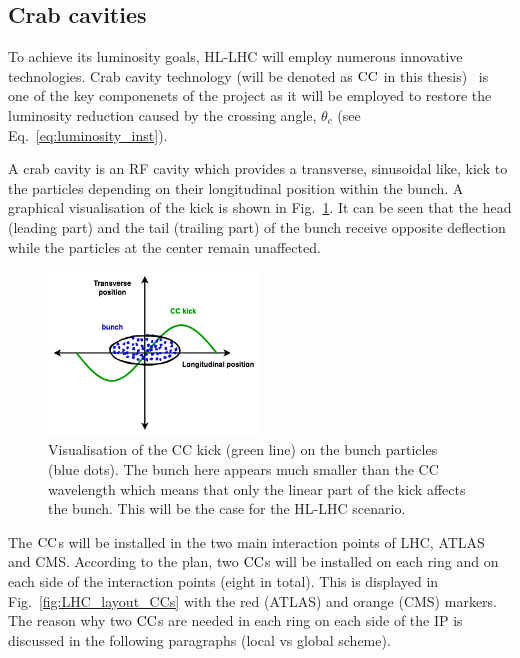 

\subsection{Crab cavities}\label{subsec:CC_intro}
To achieve its luminosity goals, HL-LHC will employ numerous innovative technologies. Crab cavity technology (will be denoted as ${\mathrm{CC}}$ in this thesis)~\cite{Calaga:2673544} is one of the key componenets of the project as it will be employed to restore the luminosity reduction caused by the crossing angle, $\theta_c$ (see Eq.~\eqref{eq:luminosity_inst}).

A crab cavity is an RF cavity which provides a transverse, sinusoidal like, kick to the particles depending on their longitudinal position within the bunch. A graphical visualisation of the kick is shown in Fig.~\ref{fig:cc_simple_kick}. It can be seen that the head (leading part) and the tail (trailing part) of the bunch receive opposite deflection while the particles at the center remain unaffected.

\begin{figure}[!h] %
    \centering         
    \includegraphics[width=0.5\textwidth]{images/introduction/sin_CC_kick_LHC_beams.drawio.png}
        \caption{Visualisation of the CC kick (green line) on the bunch particles (blue dots). The bunch here appears much smaller than the CC wavelength which means that only the linear part of the kick affects the bunch. This will be the case for the HL-LHC scenario.}
        \label{fig:cc_simple_kick}
 \end{figure}

The ${\mathrm{CC}}$s will be installed in the two main interaction points of LHC, ATLAS and CMS. According to the plan, two ${\mathrm{CC}}$s will be installed on each ring and on each side of the interaction points (eight in total). This is displayed in Fig.~\ref{fig:LHC_layout_CCs} with the red (ATLAS) and orange (CMS) markers. The reason why two ${\mathrm{CC}}$s are needed in each ring on each side of the IP is discussed in the following paragraphs (local vs global scheme).

